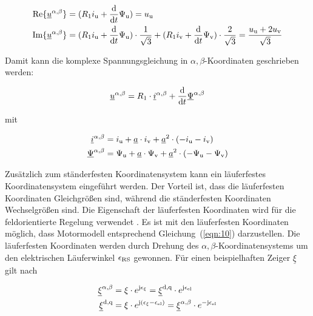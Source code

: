 \begin{align}
	\text{Re}\{ \underline{u}^{\alpha,\beta} \} &= (R_{\mathrm{1}}i_{\mathrm{u}}+\frac{\mathrm{d}}{\mathrm{d}t}\Psi_{\mathrm{u}}) = u_{\mathrm{u}} \\
	\text{Im}\{ \underline{u}^{\alpha,\beta} \} &= (R_{\mathrm{1}}i_{\mathrm{u}}+\frac{\mathrm{d}}{\mathrm{d}t}\Psi_{\mathrm{u}})\cdot \frac{1}{\sqrt{3}} + (R_{\mathrm{1}}i_{\mathrm{v}}+\frac{\mathrm{d}}{\mathrm{d}t}\Psi_{\mathrm{v}})\cdot \frac{2}{\sqrt{3}} = \frac{u_{\mathrm{u}}+2u_{\mathrm{v}}}{\sqrt{3}}
\end{align}

Damit kann die komplexe Spannungsgleichung in $\alpha,\beta$-Koordinaten geschrieben werden:

\begin{align}
	\underline{u}^{\alpha,\beta} = R_{\mathrm{1}}\cdot\underline{i}^{\alpha,\beta}+\frac{\mathrm{d}}{\mathrm{d}t}\underline{\Psi}^{\alpha,\beta}
\end{align}

mit

\begin{align}
	\underline{i}^{\alpha,\beta} &= i_{\mathrm{u}} + \underline{a}\cdot i_{\mathrm{v}} + \underline{a}^{2}\cdot (-i_{\mathrm{u}}-i_{\mathrm{v}}) \\
	\underline{\Psi}^{\alpha,\beta} &= \Psi_{\mathrm{u}} + \underline{a}\cdot \Psi_{\mathrm{v}} + \underline{a}^{2}\cdot (-\Psi_{\mathrm{u}}-\Psi_{\mathrm{v}})
\end{align}

Zusätzlich zum ständerfesten Koordinatensystem kann ein läuferfestes Koordinatensystem eingeführt werden.
Der Vorteil ist, dass die läuferfesten Koordinaten Gleichgrößen sind, während die ständerfesten Koordinaten Wechselgrößen sind.
Die Eigenschaft der läuferfesten Koordinaten wird für die feldorientierte Regelung verwendet \autocites{schroder2001}{nuss2010}{fuest2004}.
Es ist mit den läuferfesten Koordinaten möglich, dass Motormodell entsprechend Gleichung~(\ref{eqn:10}) darzustellen.
Die läuferfesten Koordinaten werden durch Drehung des $\alpha,\beta$-Koordinatensystems um den elektrischen Läuferwinkel $\epsilon_{\mathrm{RS}}$ gewonnen.
Für einen beispielhaften Zeiger $\underline{\xi}$ gilt nach \textcite{kellner2012}

\begin{align}
	\underline{\xi}^{\alpha,\beta} &= \xi \cdot e^{\mathrm{j}\epsilon_\xi} = \underline{\xi}^{\mathrm{d,q}}\cdot e^{\mathrm{j}\epsilon_{\mathrm{el}}} \label{eqn:raumzeiger-a-b}\\
	\underline{\xi}^{\mathrm{d,q}} &= \xi \cdot e^{\mathrm{j}(\epsilon_\xi - \epsilon_{\mathrm{el}})} = \underline{\xi}^{\alpha,\beta} \cdot e^{-\mathrm{j}\epsilon_{\mathrm{el}}}
\end{align}

